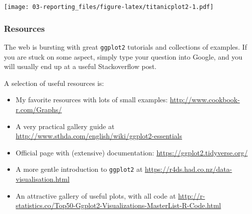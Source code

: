 \documentclass[]{book}
\newenvironment{Shaded}{\begin{snugshade}}{\end{snugshade}}
\newcommand{\CommentTok}[1]{\textcolor[rgb]{0.56,0.35,0.01}{\textit{#1}}}
\newcommand{\DataTypeTok}[1]{\textcolor[rgb]{0.13,0.29,0.53}{#1}}
\newcommand{\KeywordTok}[1]{\textcolor[rgb]{0.13,0.29,0.53}{\textbf{#1}}}
\newcommand{\NormalTok}[1]{#1}
\newcommand{\OperatorTok}[1]{\textcolor[rgb]{0.81,0.36,0.00}{\textbf{#1}}}
\newcommand{\StringTok}[1]{\textcolor[rgb]{0.31,0.60,0.02}{#1}}
\providecommand{\tightlist}{%
  \setlength{\itemsep}{0pt}\setlength{\parskip}{0pt}}
\begin{document}
\begin{Shaded}
\end{Shaded}

\texttt{[image: 03-reporting\_files/figure-latex/titanicplot2-1.pdf]}

\hypertarget{ggplotresources}{%
\subsubsection{Resources}\label{ggplotresources}}

The web is bursting with great \texttt{ggplot2} tutorials and collections of examples. If you are stuck on some aspect, simply type your question into Google, and you will usually end up at a useful Stackoverflow post.

A selection of useful resources is:

\begin{itemize}
\tightlist
\item
  My favorite resources with lots of small examples: \url{http://www.cookbook-r.com/Graphs/}
\item
  A very practical gallery guide at \url{http://www.sthda.com/english/wiki/ggplot2-essentials}
\item
  Official page with (extensive) documentation: \url{https://ggplot2.tidyverse.org/}
\item
  A more gentle introduction to \texttt{ggplot2} at \url{https://r4ds.had.co.nz/data-visualisation.html}
\item
  An attractive gallery of useful plots, with all code at \url{http://r-statistics.co/Top50-Ggplot2-Visualizations-MasterList-R-Code.html}
\end{itemize}
\end{document}
